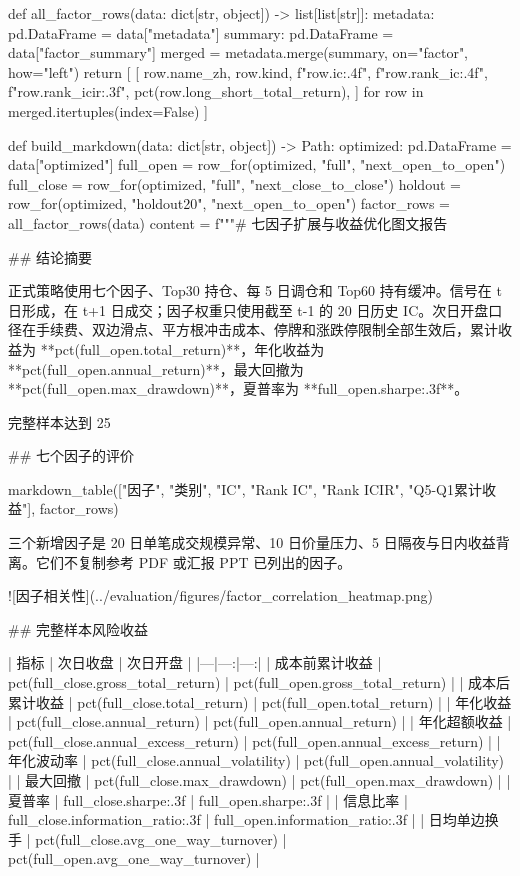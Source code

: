 \documentclass[UTF8,a4paper,fontset=fandol]{ctexart}
\begin{document}
\begin{ProjectCode}
def all_factor_rows(data: dict[str, object]) -> list[list[str]]:
    metadata: pd.DataFrame = data["metadata"]
    summary: pd.DataFrame = data["factor_summary"]
    merged = metadata.merge(summary, on="factor", how="left")
    return [
        [
            row.name_zh,
            row.kind,
            f"{row.ic:.4f}",
            f"{row.rank_ic:.4f}",
            f"{row.rank_icir:.3f}",
            pct(row.long_short_total_return),
        ]
        for row in merged.itertuples(index=False)
    ]


def build_markdown(data: dict[str, object]) -> Path:
    optimized: pd.DataFrame = data["optimized"]
    full_open = row_for(optimized, "full", "next_open_to_open")
    full_close = row_for(optimized, "full", "next_close_to_close")
    holdout = row_for(optimized, "holdout20", "next_open_to_open")
    factor_rows = all_factor_rows(data)
    content = f"""# 七因子扩展与收益优化图文报告

## 结论摘要

正式策略使用七个因子、Top30 持仓、每 5 日调仓和 Top60 持有缓冲。信号在 t 日形成，在 t+1 日成交；因子权重只使用截至 t-1 的 20 日历史 IC。次日开盘口径在手续费、双边滑点、平方根冲击成本、停牌和涨跌停限制全部生效后，累计收益为 **{pct(full_open.total_return)}**，年化收益为 **{pct(full_open.annual_return)}**，最大回撤为 **{pct(full_open.max_drawdown)}**，夏普率为 **{full_open.sharpe:.3f}**。

完整样本达到 25%

## 七个因子的评价

{markdown_table(["因子", "类别", "IC", "Rank IC", "Rank ICIR", "Q5-Q1累计收益"], factor_rows)}

三个新增因子是 20 日单笔成交规模异常、10 日价量压力、5 日隔夜与日内收益背离。它们不复制参考 PDF 或汇报 PPT 已列出的因子。

![因子相关性](../evaluation/figures/factor_correlation_heatmap.png)

## 完整样本风险收益

| 指标 | 次日收盘 | 次日开盘 |
|---|---:|---:|
| 成本前累计收益 | {pct(full_close.gross_total_return)} | {pct(full_open.gross_total_return)} |
| 成本后累计收益 | {pct(full_close.total_return)} | {pct(full_open.total_return)} |
| 年化收益 | {pct(full_close.annual_return)} | {pct(full_open.annual_return)} |
| 年化超额收益 | {pct(full_close.annual_excess_return)} | {pct(full_open.annual_excess_return)} |
| 年化波动率 | {pct(full_close.annual_volatility)} | {pct(full_open.annual_volatility)} |
| 最大回撤 | {pct(full_close.max_drawdown)} | {pct(full_open.max_drawdown)} |
| 夏普率 | {full_close.sharpe:.3f} | {full_open.sharpe:.3f} |
| 信息比率 | {full_close.information_ratio:.3f} | {full_open.information_ratio:.3f} |
| 日均单边换手 | {pct(full_close.avg_one_way_turnover)} | {pct(full_open.avg_one_way_turnover)} |


\end{ProjectCode}
\end{document}
